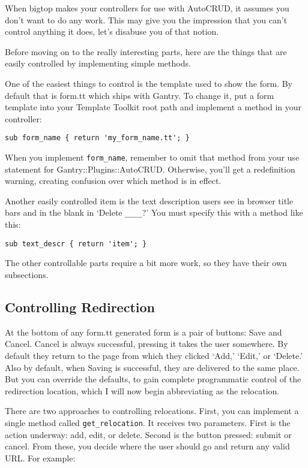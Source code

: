 When bigtop makes your controllers for use with AutoCRUD, it assumes you
don't want to do any work.  This may give you the impression that you can't
control anything it does, let's disabuse you of that notion.

Before moving on to the really interesting parts, here are the things
that are easily controlled by implementing simple methods.

One of the easiest things to control is the template used to show the form.
By default that is form.tt which ships with Gantry.  To change it,
put a form template into your Template Toolkit root path and implement
a method in your controller:

\begin{verbatim}
sub form_name { return 'my_form_name.tt'; }
\end{verbatim}

When you implement \verb+form_name+, remember to omit that method from
your use statement for Gantry::Plugins::AutoCRUD.  Otherwise, you'll get
a redefinition warning, creating confusion over which method is in effect.

Another easily controlled item is the text description users see in browser
title bars and in the blank in `Delete \verb+____+?'  You must specify this
with a method like this:

\begin{verbatim}
sub text_descr { return 'item'; }
\end{verbatim}

The other controllable parts require a bit more work, so they have their
own subsections.

\subsection*{Controlling Redirection}

At the bottom of any form.tt generated form is a pair of buttons: Save
and Cancel.  Cancel is always successful, pressing it takes the user
somewhere.  By default they return to the page from which they clicked
`Add,' `Edit,' or `Delete.'  Also by default, when Saving is successful,
they are delivered to the same place.  But you can override the
defaults, to gain complete programmatic control of the redirection
location, which I will now begin abbreviating as the relocation.

There are two approaches to controlling relocations.  First, you can implement
a single method called \verb+get_relocation+.  It receives two parameters.
First is the action underway: add, edit, or delete.  Second is the
button pressed: submit or cancel.  From these, you decide where the
user should go and return any valid URL.  For example:

